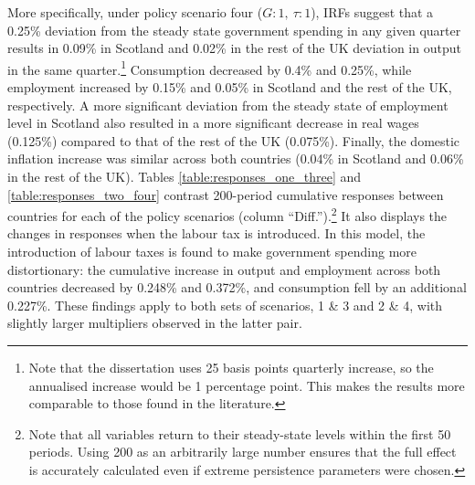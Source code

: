 More specifically, under policy scenario four ($G:1,\ \tau:1$), IRFs suggest that a 0.25\% deviation from the steady state government spending in any given quarter results in 0.09\% in Scotland and 0.02\% in the rest of the UK deviation in output in the same quarter.\footnote{Note that the dissertation uses 25 basis points quarterly increase, so the annualised increase would be 1 percentage point. This makes the results more comparable to those found in the literature.} Consumption decreased by 0.4\% and 0.25\%, while employment increased by 0.15\% and 0.05\% in Scotland and the rest of the UK, respectively. A more significant deviation from the steady state of employment level in Scotland also resulted in a more significant decrease in real wages (0.125\%) compared to that of the rest of the UK (0.075\%). Finally, the domestic inflation increase was similar across both countries (0.04\% in Scotland and 0.06\% in the rest of the UK). Tables \ref{table:responses_one_three} and \ref{table:responses_two_four} contrast 200-period cumulative responses between countries for each of the policy scenarios (column ``Diff.'').\footnote{Note that all variables return to their steady-state levels within the first 50 periods. Using 200 as an arbitrarily large number ensures that the full effect is accurately calculated even if extreme persistence parameters were chosen.} It also displays the changes in responses when the labour tax is introduced. In this model, the introduction of labour taxes is found to make government spending more distortionary: the cumulative increase in output and employment across both countries decreased by 0.248\% and 0.372\%, and consumption fell by an additional 0.227\%. These findings apply to both sets of scenarios, 1 \& 3 and 2 \& 4, with slightly larger multipliers observed in the latter pair.


